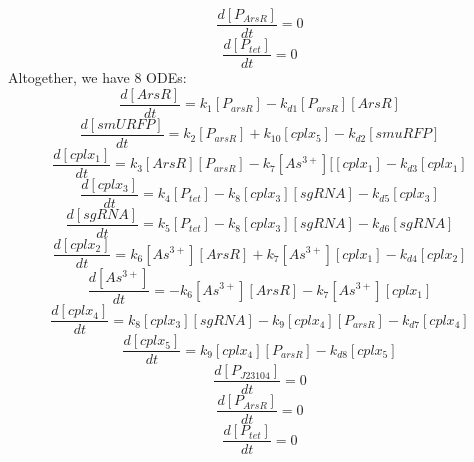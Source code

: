 \begin{equation}
\frac{d[P_{ArsR}]}{dt}=0\tag{11}
\end{equation} 
\begin{equation}
\frac{d[P_{tet}]}{dt}=0\tag{12}
\end{equation} 
Altogether, we have 8 ODEs:
\begin{equation}
\frac{d[ArsR]}{dt}=k_1[P_{arsR}]-k_{d1}[P_{arsR}][ArsR]\tag{1}
\end{equation}
\begin{equation}
\frac{d[smURFP]}{dt}=k_2[P_{arsR}]+k_{10}[cplx_5]-k_{d2}[smuRFP]\tag{2}
\end{equation}
\begin{equation}
\frac{d[cplx_1]}{dt}=k_3[ArsR][P_{arsR}]-k_7[As^{3+}][[cplx_1]-k_{d3}[cplx_1] \tag{3}
\end{equation}
\begin{equation}
\frac{d[cplx_3]}{dt}=k_4[P_{tet}]-k_{8}[cplx_3][sgRNA]-k_{d5}[cplx_3] \tag{4}
\end{equation}
\begin{equation}
\frac{d[sgRNA]}{dt}=k_5[P_{tet}]-k_{8}[cplx_3][sgRNA]-k_{d6}[sgRNA] \tag{5}
\end{equation}
\begin{equation}
\frac{d[cplx_2]}{dt}=k_{6}[As^{3+}][ArsR]+k_7[As^{3+}][cplx_1]-k_{d4}[cplx_2] \tag{6}
\end{equation}
\begin{equation}
\frac{d[As^{3+}]}{dt}=-k_{6}[As^{3+}][ArsR]-k_7[As^{3+}][cplx_1] \tag{7}
\end{equation}
\begin{equation}
\frac{d[cplx_4]}{dt}=k_{8}[cplx_3][sgRNA]-k_{9}[cplx_4][P_{arsR}]-k_{d7}[cplx_4]\tag{8}
\end{equation}
\begin{equation}
\frac{d[cplx_5]}{dt}=k_{9}[cplx_4][P_{arsR}]-k_{d8}[cplx_5]\tag{9}
\end{equation} 
\begin{equation}
\frac{d[P_{J23104}]}{dt}=0\tag{10}
\end{equation} 
\begin{equation}
\frac{d[P_{ArsR}]}{dt}=0\tag{11}
\end{equation} 
\begin{equation}
\frac{d[P_{tet}]}{dt}=0\tag{12}
\end{equation} 
\\\\
